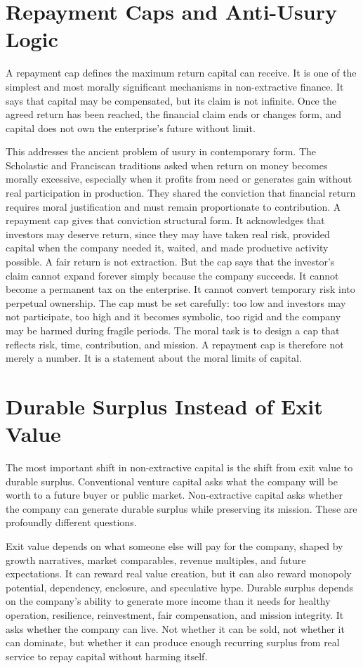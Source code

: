 \documentclass[11pt,a4paper,oneside]{book}
\begin{document}
\section*{Repayment Caps and Anti-Usury Logic}

A repayment cap defines the maximum return capital can receive. It is one of the simplest and most morally significant mechanisms in non-extractive finance. It says that capital may be compensated, but its claim is not infinite. Once the agreed return has been reached, the financial claim ends or changes form, and capital does not own the enterprise's future without limit.

This addresses the ancient problem of usury in contemporary form. The Scholastic and Franciscan traditions asked when return on money becomes morally excessive, especially when it profits from need or generates gain without real participation in production. They shared the conviction that financial return requires moral justification and must remain proportionate to contribution. A repayment cap gives that conviction structural form. It acknowledges that investors may deserve return, since they may have taken real risk, provided capital when the company needed it, waited, and made productive activity possible. A fair return is not extraction. But the cap says that the investor's claim cannot expand forever simply because the company succeeds. It cannot become a permanent tax on the enterprise. It cannot convert temporary risk into perpetual ownership. The cap must be set carefully: too low and investors may not participate, too high and it becomes symbolic, too rigid and the company may be harmed during fragile periods. The moral task is to design a cap that reflects risk, time, contribution, and mission. A repayment cap is therefore not merely a number. It is a statement about the moral limits of capital.

\section*{Durable Surplus Instead of Exit Value}

The most important shift in non-extractive capital is the shift from exit value to durable surplus. Conventional venture capital asks what the company will be worth to a future buyer or public market. Non-extractive capital asks whether the company can generate durable surplus while preserving its mission. These are profoundly different questions.

Exit value depends on what someone else will pay for the company, shaped by growth narratives, market comparables, revenue multiples, and future expectations. It can reward real value creation, but it can also reward monopoly potential, dependency, enclosure, and speculative hype. Durable surplus depends on the company's ability to generate more income than it needs for healthy operation, resilience, reinvestment, fair compensation, and mission integrity. It asks whether the company can live. Not whether it can be sold, not whether it can dominate, but whether it can produce enough recurring surplus from real service to repay capital without harming itself.
\end{document}
